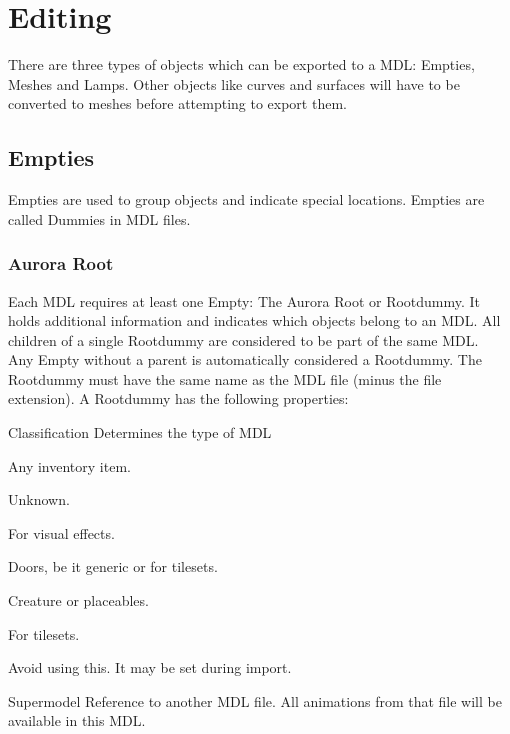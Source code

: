 \chapter{Editing}
There are three types of objects which can be exported to a MDL: Empties,
Meshes and Lamps. Other objects like curves and surfaces will have to be
converted to meshes before attempting to export them.

\section{Empties}
Empties are used to group objects and indicate special 
locations. Empties are called Dummies in MDL files.


\subsection{Aurora Root}
Each MDL requires at least one Empty: The Aurora Root or Rootdummy. It holds 
additional information and indicates which objects belong to an MDL. All children
of a single Rootdummy are considered to be part of the same MDL. \\

Any Empty without a parent is automatically considered a Rootdummy. 
The Rootdummy must have the same name as the MDL file (minus the file extension). 
A Rootdummy has the following properties:

\begin{property}{Classification}
Determines the type of MDL
\begin{description}[leftmargin=6em,style=nextline]
    \item[Item] Any inventory item.
    \item[GUI] Unknown.
    \item[Effect] For visual effects.
    \item[Door] Doors, be it generic or for tilesets.
    \item[Character] Creature or placeables. 
    \item[Tile] For tilesets.
    \item[Unknown] Avoid using this. It may be set during import.
\end{description}
\end{property}

\begin{property}{Supermodel}
Reference to another MDL file. All animations from that file 
will be available in this MDL.
\end{property}

